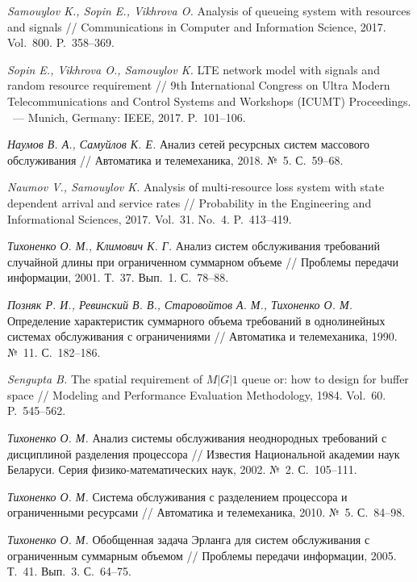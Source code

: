\documentclass[a4paper,12pt]{article}
\begin{document}
\begin{enumerate}
\textit{Samouylov K., Sopin E., Vikhrova O.}
Analysis of queueing system with resources and signals // {Communications in Computer and Information Science}, 2017. Vol.~800. P.~358--369.

\textit{Sopin E., Vikhrova O., Samouylov K.}
LTE network model with signals and random resource requirement // {9th International Congress on Ultra Modern Telecommunications and Control Systems and Workshops (ICUMT) Proceedings}. ~--- Munich, Germany: IEEE, 2017. P.~101--106.

\textit{Наумов В. А., Самуйлов К. Е.}
Анализ сетей ресурсных систем массового обслуживания // {Автоматика и телемеханика}, 2018. №~5. С.~59--68.

\textit{Naumov V., Samouylov K.}
Analysis оf multi-resource loss system with state dependent arrival and service rates // {Probability in the Engineering and Informational Sciences}, 2017. Vol.~31. No.~4. P.~413--419.

\textit{Тихоненко О. М., Климович К. Г.}
Анализ систем обслуживания требований случайной длины при ограниченном суммарном объеме // {Проблемы передачи информации}, 2001. Т.~37. Вып.~1. С.~78--88.

\textit{Позняк Р. И., Ревинский В. В., Старовойтов А. М., Тихоненко О. М.}
Определение характеристик суммарного объема требований в однолинейных системах обслуживания с ограничениями // {Автоматика и телемеханика}, 1990. №~11. С.~182--186.

\textit{Sengupta B.}
The spatial requirement of $M|G|1$ queue or: how to design for buffer space // {Modeling and Performance Evaluation Methodology}, 1984. Vol.~60. P.~545--562.

\textit{Тихоненко О. М.}
Анализ системы обслуживания неоднородных требований с дисциплиной разделения процессора // {Известия Национальной академии наук Беларуси. Серия физико-математических наук}, 2002. №~2. С.~105--111.

\textit{Тихоненко О. М.}
Система обслуживания с разделением процессора и ограниченными ресурсами // {Автоматика и телемеханика}, 2010. №~5. С.~84--98.

\textit{Тихоненко О. М.}
Обобщенная задача Эрланга для систем обслуживания с ограниченным суммарным объемом // {Проблемы передачи информации}, 2005. Т.~41. Вып.~3. С.~64--75.


\end{enumerate}
\end{document}
